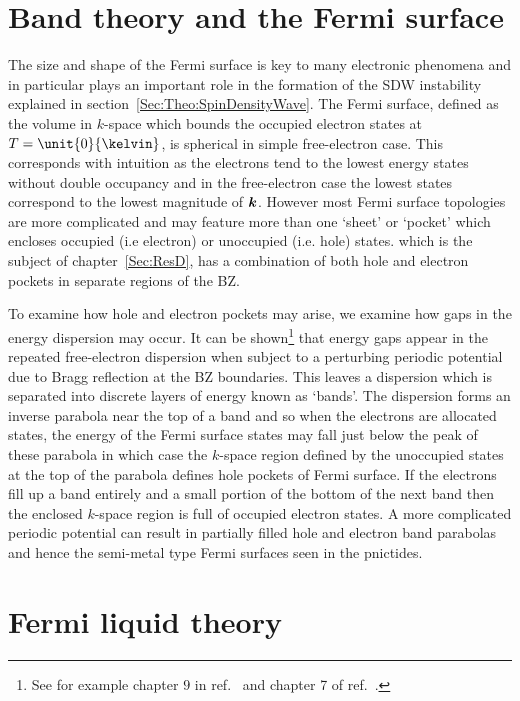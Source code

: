 
\section{Band theory and the Fermi surface}
    \label{Sec:Theo:BandTheory}

The size and shape of the Fermi surface is key to many electronic phenomena and in particular plays an important role in the formation of the \acf{SDW} instability explained in section~\ref{Sec:Theo:SpinDensityWave}. The Fermi surface, defined as the volume in $k$-space which bounds the occupied electron states at $T=\unit{0}{\kelvin}$, is spherical in simple free-electron case. This corresponds with intuition as the electrons tend to the lowest energy states without double occupancy and in the free-electron case the lowest states correspond to the lowest magnitude of $\boldsymbol{k}$. However most Fermi surface topologies are more complicated and may feature more than one `sheet' or `pocket' which encloses occupied (i.e electron) or unoccupied (i.e. hole) states. \BaFeP{} which is the subject of chapter~\ref{Sec:ResD}, has a combination of both hole and electron pockets in separate regions of the \ac{BZ}.

To examine how hole and electron pockets may arise, we examine how gaps in the energy dispersion may occur. It can be shown\footnote{See for example chapter $9$ in ref.~\cite{Ashcroft1976} and chapter 7 of ref.~\cite{Kittel1996}.} that energy gaps appear in the repeated free-electron dispersion when subject to a perturbing periodic potential due to Bragg reflection at the \ac{BZ} boundaries. This leaves a dispersion which is separated into discrete layers of energy known as `bands'. The dispersion forms an inverse parabola near the top of a band and so when the electrons are allocated states, the energy of the Fermi surface states may fall just below the peak of these parabola in which case the $k$-space region defined by the unoccupied states at the top of the parabola defines hole pockets of Fermi surface. If the electrons fill up a band entirely and a small portion of the bottom of the next band then the enclosed $k$-space region is full of occupied electron states. A more complicated periodic potential can result in partially filled hole and electron band parabolas and hence the semi-metal type Fermi surfaces seen in the pnictides.

\section{Fermi liquid theory}
    \label{Sec:Theo:FermiLiquidTheory}

